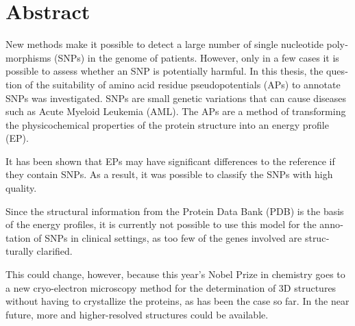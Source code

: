 \chapter{Abstract}

\begin{english} %
New methods make it possible to detect a large number of single nucleotide polymorphisms (SNPs) in the genome of patients. However, only in a few cases it is possible to assess whether an SNP is potentially harmful. In this thesis, the question of the suitability of amino acid residue pseudopotentials (APs) to annotate SNPs was investigated. SNPs are small genetic variations that can cause diseases such as Acute Myeloid Leukemia (AML). The APs are a method of transforming the physicochemical properties of the protein structure into an energy profile (EP).

It has been shown that EPs may have significant differences to the reference if they contain SNPs. As a result, it was possible to classify the SNPs with high quality.

Since the structural information from the Protein Data Bank (PDB) is the basis of the energy profiles, it is currently not possible to use this model for the annotation of SNPs in clinical settings, as too few of the genes involved are structurally clarified.

This could change, however, because this year's Nobel Prize in chemistry goes to a new cryo-electron microscopy method for the determination of 3D structures without having to crystallize the proteins, as has been the case so far. In the near future, more and higher-resolved structures could be available.
\end{english}
